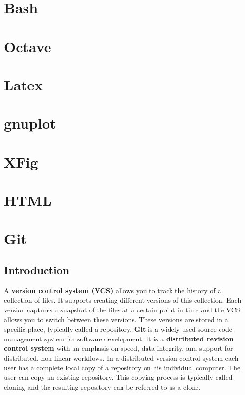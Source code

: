 \documentclass{article}
\author{}
\date{}
\begin{document}
\maketitle

\section{Bash}
\section{Octave}
\section{Latex}
\section{gnuplot}
\section{XFig}
\section{HTML}
\section{Git}
	\subsection{Introduction}
	A \textbf{version control system (VCS)} allows you to track the history of a collection of files. It supports creating different versions of this collection. Each version captures a snapshot of the files at a certain point in time and the VCS allows you to switch between these versions. These versions are stored in a specific place, typically called a repository.
	\textbf{Git} is a widely used source code management system for software development. It is a \textbf{distributed revision control system} with an emphasis on speed, data integrity, and support for distributed, non-linear workflows. In a distributed version control system each user has a complete local copy of a repository on his individual computer. The user can copy an existing repository. This copying process is typically called cloning and the resulting repository can be referred to as a clone.
	
\end{document}

